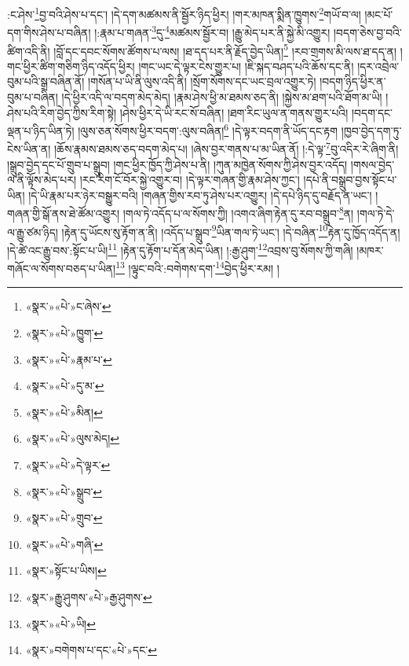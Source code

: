 :ང་ཤེས་\footnote{«སྣར་»«པེ་»ང་ཞེས་}བྱ་བའི་ཤེས་པ་དང་། །དེ་དག་མཚམས་ནི་སྦྱོར་ཉིད་ཕྱིར། །གར་མཁན་སྨིན་ཁྱུགས་\footnote{«སྣར་»«པེ་»ཁྱུག་}གཡོ་བ་ལ། །མང་པོ་དག་གིས་ཤེས་པ་བཞིན། །:རྣམ་པ་གཞན་\footnote{«སྣར་»«པེ་»རྣམ་པ་}དུ་\footnote{«སྣར་»«པེ་»དུ་མ་}མཚམས་སྦྱོར་བ། །རྒྱུ་མེད་པར་ནི་སྐྱེ་མི་འགྱུར། །བདག་ཅེས་བྱ་བའི་ཚིག་འདི་ནི། །བློ་དང་དབང་སོགས་ཚོགས་པ་ལས། །ཐ་དད་པར་ནི་རྗོད་བྱེད་ཡིན།\footnote{«སྣར་»«པེ་»མིན།} །རབ་གྲགས་མི་ལས་ཐ་དད་ན། །གང་ཕྱིར་ཚིག་གཅིག་ཉིད་འདོད་ཕྱིར། །གང་ཡང་དེ་ལྟར་ངེས་གྱུར་པ། །ཇི་སྐད་བཤད་པའི་ཆོས་དང་ནི། །དར་འབྲེལ་བུམ་པའི་སྒྲ་བཞིན་ནོ། །གསོན་པ་ཡི་ནི་ལུས་འདི་ནི། །སྲོག་སོགས་དང་ཡང་བྲལ་འགྱུར་ཏེ། །བདག་ཉིད་ཕྱིར་ན་བུམ་པ་བཞིན། །དེ་ཕྱིར་འདི་ལ་བདག་མེད་མེད། །རྣམ་ཤེས་ཕྱི་མ་ཐམས་ཅད་ནི། །སྐྱེས་མ་ཐག་པའི་ཐོག་མ་ཡི། །ཤེས་པའི་རིག་བྱེད་ཀྱིས་རིག་སྟེ། །ཤེས་ཕྱིར་དེ་ཡི་རང་སོ་བཞིན། །ཐག་རིང་ཡུལ་ན་གནས་གྱུར་པའི། །བདག་དང་ལྡན་པ་ཉིད་ཡིན་ཏེ། །ལུས་ཅན་སོགས་ཕྱིར་བདག་:ལུས་བཞིན།\footnote{«སྣར་»«པེ་»ལུས་མེད།} །དེ་ལྟར་བདག་ནི་ཡོད་དང་རྟག །ཁྱབ་བྱེད་དག་ཏུ་ངེས་ཡིན་ན། །ཆོས་རྣམས་ཐམས་ཅད་བདག་མེད་པ། །ཞེས་བྱར་གནས་པ་མ་ཡིན་ནོ། །:དེ་ལྟ་\footnote{«སྣར་»«པེ་»དེ་ལྟར་}བུ་འདིར་རེ་ཞིག་ནི། །སྒྲུབ་བྱེད་དང་པོ་གྲུབ་པ་སྒྲུབ། །གང་ཕྱིར་ཁྱོད་ཀྱི་ཤེས་པ་ནི། །ཀུན་མཁྱེན་སོགས་ཀྱི་ཤེས་བྱར་འདོད། །གསལ་བྱེད་ལ་ནི་ལྟོས་མེད་པར། །རང་རིག་ངོ་བོར་སྐྱེ་འགྱུར་བ། །དེ་ལྟར་གཞན་གྱི་རྣམ་ཤེས་ཀྱང་། །དཔེ་ནི་བསྒྲུབ་བྱས་སྟོང་པ་ཡིན། །དེ་ཡི་རྣམ་པར་ཉེར་བསྒྱུར་བའི། །གཞན་གྱིས་རབ་ཏུ་ཤེས་པར་འགྱུར། །དེ་དཔེ་ཉིད་དུ་བརྗོད་ན་ཡང་། །གཞན་གྱི་སྒོ་ནས་ཐེ་ཚོམ་འགྱུར། །གལ་ཏེ་འདོད་པ་ལ་སོགས་ཀྱི། །འགའ་ཞིག་རྟེན་དུ་རབ་བསྒྲུབ་\footnote{«སྣར་»«པེ་»སྒྲུབ་}ན། །གལ་ཏེ་དེ་ལ་རྒྱུ་ཙམ་ཉིད། །རྟེན་དུ་ཡོངས་སུ་རྟོག་ན་ནི། །འདོད་པ་སྒྲུབ་\footnote{«སྣར་»«པེ་»གྲུབ་}ཡིན་གལ་ཏེ་ཡང་། །དེ་བཞིན་\footnote{«སྣར་»«པེ་»གཞི་}རྟེན་དུ་ཁྱོད་འདོད་ན། །དེ་ཚེ་འང་རྒྱུ་བས་:སྟོང་པ་ཡི།\footnote{«སྣར་»སྟོང་པ་ཡིས།} །རྟེན་དུ་རྟོག་པ་དོན་མེད་ཡིན། །:རྒྱ་ཤུག་\footnote{«སྣར་»རྒྱུ་ཤུགས་«པེ་»རྒྱ་ཤུགས་}འབྲས་བུ་སོགས་ཀྱི་གཞི། །མཁར་གཞོང་ལ་སོགས་བཅད་པ་ཡིན།\footnote{«སྣར་»«པེ་»ཡི།} །ལྟུང་བའི་:བགེགས་དག་\footnote{«སྣར་»བགེགས་པ་དང་«པེ་»དང་}བྱེད་ཕྱིར་རམ། །
